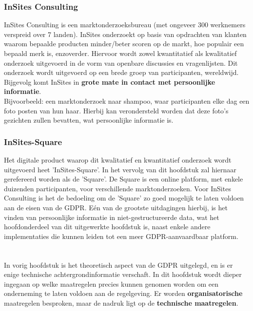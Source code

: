 \subsection{InSites Consulting}
InSites Consulting is een marktonderzoeksbureau (met ongeveer 300 werknemers verspreid over 7 landen). InSites onderzoekt op basis van opdrachten van klanten waarom bepaalde producten minder/beter scoren op de markt, hoe populair een bepaald merk is, enzoverder. Hiervoor wordt zowel kwantitatief als kwalitatief onderzoek uitgevoerd in de vorm van openbare discussies en vragenlijsten. Dit onderzoek wordt uitgevoerd op een brede groep van participanten, wereldwijd. Bijgevolg komt InSites in \textbf{grote mate in contact met persoonlijke informatie}. \\
Bijvoorbeeld: een marktonderzoek naar shampoo, waar participanten elke dag een foto posten van hun haar. Hierbij kan verondersteld worden dat deze foto's gezichten zullen bevatten, wat persoonlijke informatie is. 

\subsection{InSites-Square}
Het digitale product waarop dit kwalitatief en kwantitatief onderzoek wordt uitgevoerd heet 'InSites-Square'. In het vervolg van dit hoofdstuk zal hiernaar gerefereerd worden als de 'Square'. 
De Square is een online platform, met enkele duizenden participanten, voor verschillende marktonderzoeken. 
Voor InSites Consulting is het de bedoeling om de 'Square' zo goed mogelijk te laten voldoen aan de eisen van de GDPR. Eén van de grootste uitdagingen hierbij, is het vinden van persoonlijke informatie in niet-gestructureerde data, wat het hoofdonderdeel van dit uitgewerkte hoofdstuk is, naast enkele andere implementaties die kunnen leiden tot een meer GDPR-aanvaardbaar platform.  

\chapter{}
\label{ch:Maatregelen}
In vorig hoofdstuk is het theoretisch aspect van de GDPR uitgelegd, en is er enige technische achtergrondinformatie verschaft. In dit hoofdstuk wordt dieper ingegaan op welke maatregelen precies kunnen genomen worden om een onderneming te laten voldoen aan de regelgeving. Er worden \textbf{organisatorische} maatregelen besproken, maar de nadruk ligt op de \textbf{technische maatregelen}. 

